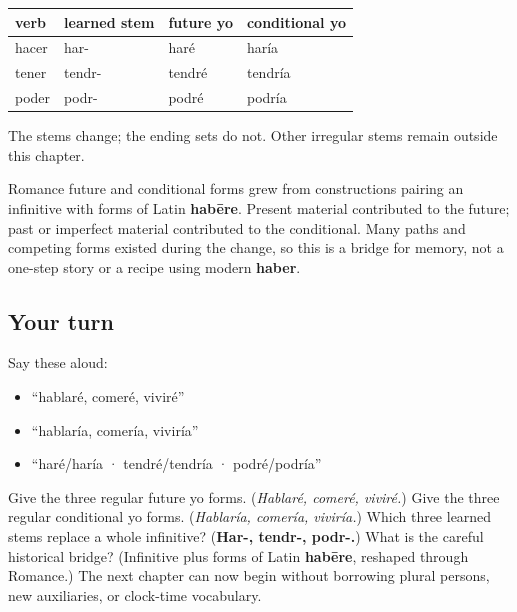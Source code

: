 \begin{grammarlens}[title={Grammar Lens: three learned stems}]
\noindent
\begin{tabularx}{\linewidth}{@{}>{\raggedright\arraybackslash}X>{\raggedright\arraybackslash}X>{\raggedright\arraybackslash}X>{\raggedright\arraybackslash}X@{}}
\toprule
\textbf{verb} & \textbf{learned stem} & \textbf{future yo} & \textbf{conditional yo} \\
\midrule
hacer & har- & haré & haría \\
tener & tendr- & tendré & tendría \\
poder & podr- & podré & podría \\
\bottomrule
\end{tabularx}

The stems change; the ending sets do not. Other irregular stems remain outside this chapter.
\end{grammarlens}

\begin{cousinweb}
Romance future and conditional forms grew from constructions pairing an infinitive with forms of Latin \textbf{habēre}. Present material contributed to the future; past or imperfect material contributed to the conditional. Many paths and competing forms existed during the change, so this is a bridge for memory, not a one-step story or a recipe using modern \textbf{haber}.
\end{cousinweb}

\subsection*{Your turn}
Say these aloud:

\begin{itemize}
\raggedright
  \item “hablaré, comeré, viviré”
  \item “hablaría, comería, viviría”
  \item “haré/haría · tendré/tendría · podré/podría”
\end{itemize}

\begin{tcolorbox}[breakable,colback=teal!4,colframe=teal!35!black,title={Before you move on}]
Give the three regular future yo forms. (\emph{Hablaré, comeré, viviré.}) Give the three regular conditional yo forms. (\emph{Hablaría, comería, viviría.}) Which three learned stems replace a whole infinitive? (\textbf{Har-, tendr-, podr-.}) What is the careful historical bridge? (Infinitive plus forms of Latin \textbf{habēre}, reshaped through Romance.) The next chapter can now begin without borrowing plural persons, new auxiliaries, or clock-time vocabulary.
\end{tcolorbox}
